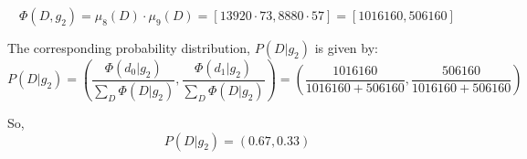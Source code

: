 \documentclass[11pt,a4paper]{article}
\begin{document}
	$$ \Phi(D, g_2) = \mu_8(D) \cdot \mu_9(D) = [13920 \cdot 73, 8880 \cdot 57] = [1016160, 506160] $$
	
	The corresponding probability distribution, $P(D | g_2)$ is given by:
	$$ P(D | g_2) = \left(\frac{\Phi(d_0 | g_2)}{\sum_{D}\Phi(D | g_2)}, \frac{\Phi(d_1 | g_2)}{\sum_{D}\Phi(D | g_2)}\right) = \left(\frac{1016160}{1016160+506160},\frac{506160}{1016160+506160}\right) $$
	
	So,
	$$ P(D | g_2) = (0.67,0.33) $$
	
	
	
	
\end{document}
